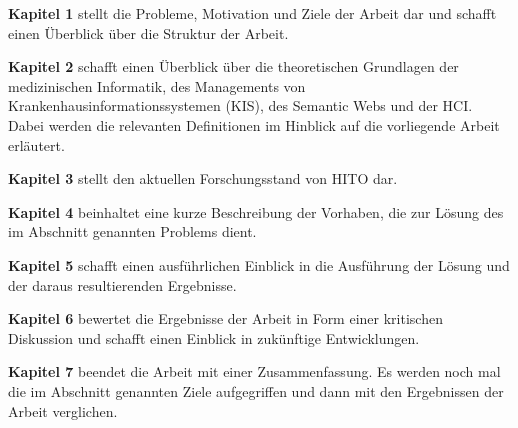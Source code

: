 \textbf{Kapitel 1} stellt die Probleme, Motivation und Ziele der Arbeit dar und schafft einen Überblick über die Struktur der Arbeit. \newline

\textbf{Kapitel 2} schafft einen Überblick über die theoretischen Grundlagen der medizinischen Informatik, des Managements von Krankenhausinformationssystemen (KIS), des Semantic Webs und der \ac{HCI}. Dabei werden die relevanten Definitionen im Hinblick auf die vorliegende Arbeit erläutert.  \newline

\textbf{Kapitel 3} stellt den aktuellen Forschungsstand von HITO dar. \newline

\textbf{Kapitel 4} beinhaltet eine kurze Beschreibung der Vorhaben, die zur Lösung des im Abschnitt  genannten Problems dient. \newline

\textbf{Kapitel 5} schafft einen ausführlichen Einblick in die Ausführung der Lösung und der daraus resultierenden Ergebnisse.  \newline

\textbf{Kapitel 6} bewertet die Ergebnisse der Arbeit in Form einer kritischen Diskussion und schafft einen Einblick in zukünftige Entwicklungen. \newline

\textbf{Kapitel 7} beendet die Arbeit mit einer Zusammenfassung. Es werden noch mal die im Abschnitt  genannten Ziele aufgegriffen und dann mit den Ergebnissen der Arbeit verglichen.



